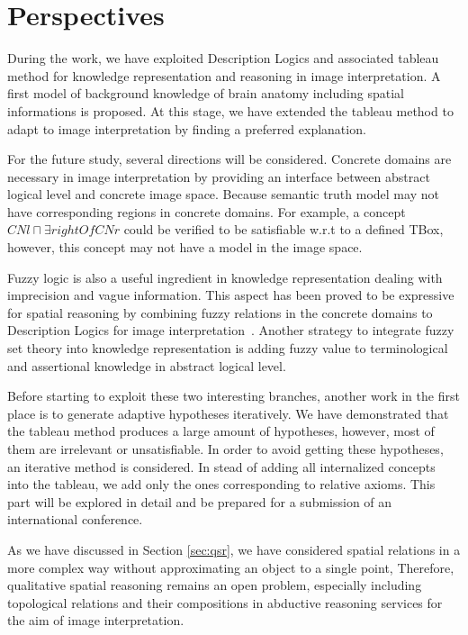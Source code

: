 \documentclass{article}
\begin{document}
\section{Perspectives}\label{sec:persp}
During the work, we have exploited Description Logics and associated tableau method for knowledge representation and reasoning in image interpretation.
A first model of background knowledge of brain anatomy  including spatial informations is proposed.  
At this stage, we have extended the tableau method to adapt to image interpretation by finding a preferred explanation.

For the future study, several directions will be considered.
Concrete domains are necessary in image interpretation by providing an interface between abstract logical level and concrete image space.
Because semantic truth model may not have corresponding regions in concrete domains.
For example, a concept $CNl\sqcap \exists rightOf CNr$ could be verified to be satisfiable w.r.t to a defined TBox, however,
this concept may not have a model in the image space.

Fuzzy logic is also a useful ingredient in knowledge representation dealing with imprecision and vague information.
This aspect has been proved to be expressive for spatial reasoning by combining fuzzy relations in the concrete domains to Description Logics for image interpretation~\cite{hudelot2008spatial}.
Another strategy to integrate fuzzy set theory into knowledge representation is adding fuzzy value to terminological and assertional knowledge in abstract logical level.

Before starting to exploit these two interesting branches, another work in the first place is to generate adaptive hypotheses iteratively.
We have demonstrated that the tableau method produces a large amount of hypotheses, however, most of them are irrelevant or unsatisfiable.
In order to avoid getting these hypotheses, an iterative method is considered.
In stead of adding all internalized concepts into the tableau, we add only the ones corresponding to relative axioms.
This part will be explored in detail and be prepared for a submission of an international conference.

As we have discussed in Section \ref{sec:qsr}, we have considered spatial relations in a more complex way without approximating an object to a single point,
Therefore, qualitative spatial reasoning remains an open problem, especially including topological relations and their compositions in abductive reasoning services for the aim of image interpretation.
\end{document}
